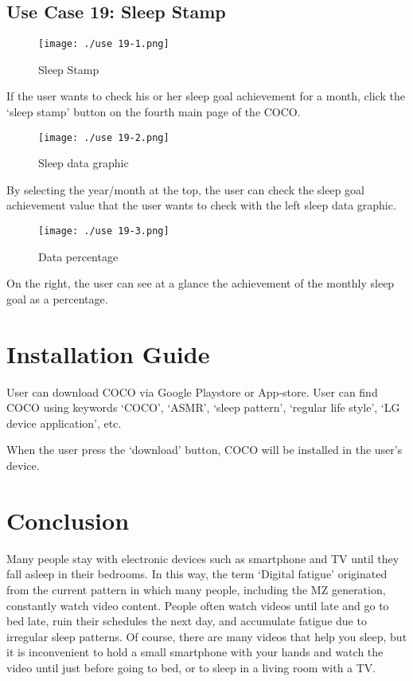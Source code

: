 \documentclass[conference]{IEEEtran}
\begin{document}
\subsection{Use Case 19: Sleep Stamp}

\begin{figure}[H]
\texttt{[image: ./use 19-1.png]}
\centering
\caption{Sleep Stamp}
\end{figure}

If the user wants to check his or her sleep goal achievement for a month, click the ‘sleep stamp’ button on the fourth main page of the COCO.

\begin{figure}[H]
\texttt{[image: ./use 19-2.png]}
\centering
\caption{Sleep data graphic}
\end{figure}

By selecting the year/month at the top, the user can check the sleep goal achievement value that the user wants to check with the left sleep data graphic.

\begin{figure}[H]
\texttt{[image: ./use 19-3.png]}
\centering
\caption{Data percentage}
\end{figure}

On the right, the user can see at a glance the achievement of the monthly sleep goal as a percentage.
\vspace{2\baselineskip}
\section{Installation Guide}

User can download COCO via Google Playstore or App-store. User can find COCO using keywords ‘COCO’, ‘ASMR’, ‘sleep pattern’, ‘regular life style’, ‘LG device application’, etc.

When the user press the ‘download’ button, COCO will be installed in the user's device.
\vspace{2\baselineskip}
\section{Conclusion}

Many people stay with electronic devices such as smartphone and TV until they fall asleep in their bedrooms. In this way, the term ‘Digital fatigue’ originated from the current pattern in which many people, including the MZ generation, constantly watch video content. People often watch videos until late and go to bed late, ruin their schedules the next day, and accumulate fatigue due to irregular sleep patterns. Of course, there are many videos that help you sleep, but it is inconvenient to hold a small smartphone with your hands and watch the video until just before going to bed, or to sleep in a living room with a TV.
\end{document}
